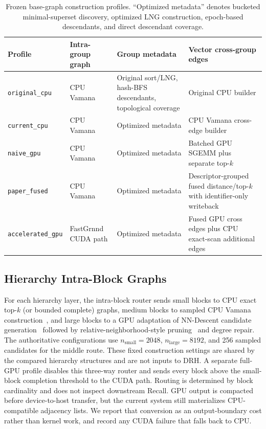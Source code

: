 \documentclass[sigconf,review,anonymous]{acmart}
\begin{document}
\begin{table}[t]
\caption{Frozen base-graph construction profiles.  ``Optimized metadata''
denotes bucketed minimal-superset discovery, optimized LNG construction,
epoch-based descendants, and direct descendant coverage.}
\label{tab:base-build-profiles}
\centering
\scriptsize
\begin{tabular}{p{}p{}p{}p{}}
\toprule
Profile & Intra-group graph & Group metadata & Vector cross-group edges \\
\midrule
\texttt{original\_cpu} & CPU Vamana & Original sort/LNG, hash-BFS descendants, topological coverage & Original CPU builder \\
\texttt{current\_cpu} & CPU Vamana & Optimized metadata & CPU Vamana cross-edge builder \\
\texttt{naive\_gpu} & CPU Vamana & Optimized metadata & Batched GPU SGEMM plus separate top-$k$ \\
\texttt{paper\_fused} & CPU Vamana & Optimized metadata & Descriptor-grouped fused distance/top-$k$ with identifier-only writeback \\
\texttt{accelerated\_gpu} & FastGrnnd CUDA path & Optimized metadata & Fused GPU cross edges plus CPU exact-scan additional edges \\
\bottomrule
\end{tabular}
\end{table}

\subsection{Hierarchy Intra-Block Graphs}
For each hierarchy layer, the intra-block router sends small blocks to CPU
exact top-$k$ (or bounded
complete) graphs, medium blocks to sampled CPU Vamana
construction~\cite{subramanya2019diskann}, and large blocks to a GPU adaptation
of NN-Descent candidate generation~\cite{dong2011nndescent} followed by
relative-neighborhood-style pruning~\cite{toussaint1980rng} and degree repair.
The authoritative configurations use
$n_{\mathrm{small}}=2048$, $n_{\mathrm{large}}=8192$, and 256 sampled
candidates for the middle route.  These fixed construction settings are shared
by the compared hierarchy structures and are not inputs to DRH.  A separate
full-GPU profile disables this three-way router and sends every block above the
small-block completion threshold to the CUDA path.  Routing is determined by
block cardinality and does not inspect downstream Recall.  GPU output is
compacted before device-to-host transfer, but the current system still
materializes CPU-compatible adjacency lists.  We report that conversion as an
output-boundary cost rather than kernel work, and record any CUDA failure that
falls back to CPU.
\end{document}
